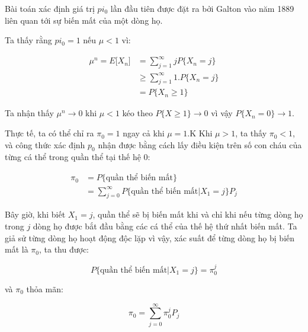 \documentclass[14pt, a4paper]{article}
\numberwithin{equation}{section}
\numberwithin{figure}{section}
\theoremstyle{sltheorem}
\theoremstyle{soltheorem}
\numberwithin{dl}{section}
\numberwithin{md}{section}
\numberwithin{vd}{section}
\begin{document}
    Bài toán xác định giá trị $pi_0$ lần đầu tiên được đặt ra bởi Galton vào năm 1889 liên quan tới sự biến mất của một dòng họ.

    Ta thấy rằng $pi_0 = 1$ nếu $\mu < 1$ vì:

    \begin{equation*}
        \begin{aligned}
            \mu^n = E \lbrack X_n \rbrack &= \sum_{j=1}^{\infty} j P \lbrace X_n = j \rbrace \\
            & \geq \sum_{j=1}^{\infty} 1. P \lbrace X_n = j \rbrace \\
            & = P \lbrace X_n \geq 1 \rbrace
        \end{aligned}
    \end{equation*}

    Ta nhận thấy $\mu^n \rightarrow 0$ khi $\mu < 1$ kéo theo $P \lbrace X \geq 1 \rbrace \rightarrow 0$ vì vậy $P \lbrace X_n = 0 \rbrace \rightarrow 1$.

    Thực tế, ta có thể chỉ ra $\pi_0 = 1$ ngay cả khi $\mu = 1$.K
    Khi $\mu > 1$, ta thấy $\pi_0 < 1$, và công thức xác định $p_0$ nhận được bằng cách lấy điều kiện trên số con cháu của từng cá thể trong quần thể tại thế hệ 0:

    \begin{equation*}
        \begin{aligned}
            \pi_0 &= P \lbrace \text{quần thể biến mất} \rbrace \\
            &= \sum_{j=0}^{\infty} P \lbrace \text{quần thể biến mất} \vert X_1 = j \rbrace P_j
        \end{aligned}        
    \end{equation*}

    Bây giờ, khi biết $X_1 = j$, quần thể sẽ bị biến mất khi và chỉ khi nếu từng dòng họ trong $j$ dòng họ được bắt đầu bằng các cá thể của thế hệ thứ nhất biến mất.
    Ta giả sử từng dòng họ hoạt động độc lặp vì vậy, xác suất để từng dòng họ bị biến mất là $\pi_0$, ta thu được:
    
    \begin{equation*}
        P \lbrace \text{quần thể biến mất}\vert X_1 = j \rbrace = \pi_0^j
    \end{equation*}

    và $\pi_0$ thỏa mãn:

    \begin{equation} \label{eq:pi_0}
        \pi_0 = \sum_{j=0}^{\infty} \pi_0^j P_j
    \end{equation}
\end{document}

